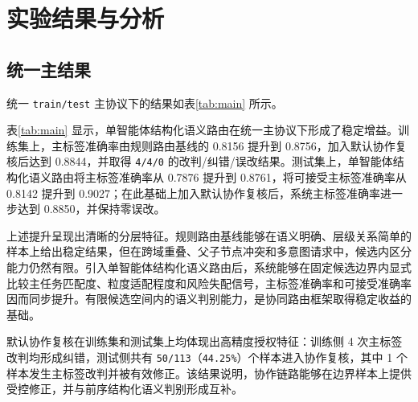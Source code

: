 \documentclass[10pt,a4paper,twocolumn,fontset=fandol]{ctexart}
\begin{document}
\section{实验结果与分析}

\subsection{统一主结果}

统一 \texttt{train/test} 主协议下的结果如表\ref{tab:main} 所示。

\begin{table}[htbp]
\centering
\caption{统一 \texttt{train/test} 主协议下的主标签结果}
\label{tab:main}
\small
\setlength{\tabcolsep}{3.8pt}
\end{table}

表\ref{tab:main} 显示，单智能体结构化语义路由在统一主协议下形成了稳定增益。训练集上，主标签准确率由规则路由基线的 0.8156 提升到 0.8756，加入默认协作复核后达到 0.8844，并取得 \texttt{4/4/0} 的改判/纠错/误改结果。测试集上，单智能体结构化语义路由将主标签准确率从 0.7876 提升到 0.8761，将可接受主标签准确率从 0.8142 提升到 0.9027；在此基础上加入默认协作复核后，系统主标签准确率进一步达到 0.8850，并保持零误改。

上述提升呈现出清晰的分层特征。规则路由基线能够在语义明确、层级关系简单的样本上给出稳定结果，但在跨域重叠、父子节点冲突和多意图请求中，候选内区分能力仍然有限。引入单智能体结构化语义路由后，系统能够在固定候选边界内显式比较主任务匹配度、粒度适配程度和风险失配信号，主标签准确率和可接受准确率因而同步提升。有限候选空间内的语义判别能力，是协同路由框架取得稳定收益的基础。

默认协作复核在训练集和测试集上均体现出高精度授权特征：训练侧 4 次主标签改判均形成纠错，测试侧共有 \texttt{50/113}（\texttt{44.25\%}）个样本进入协作复核，其中 1 个样本发生主标签改判并被有效修正。该结果说明，协作链路能够在边界样本上提供受控修正，并与前序结构化语义判别形成互补。
\end{document}
